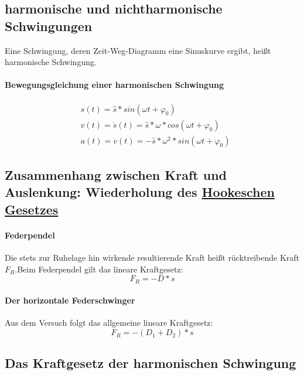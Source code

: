 	\subsection{harmonische und nichtharmonische Schwingungen}
	Eine Schwingung, deren Zeit-Weg-Diagramm eine Sinuskurve ergibt, heißt harmonische Schwingung.
	\paragraph{Bewegungsgleichung einer harmonischen Schwingung}
	\begin{align*}
	&s(t)=\hat{s}*sin(\omega t+\varphi_{0})\\
	&v(t)=\dot{s}(t)=\hat{s}*\omega*cos(\omega t+\varphi_{0})\\
	&a(t)=\dot{v}(t)=-\hat{s}*\omega^{2}*sin(\omega t+\varphi_{0})
	\end{align*}

	\subsection{Zusammenhang zwischen Kraft und Auslenkung: Wiederholung des \underline{Hookeschen Gesetzes}}
	\paragraph{Federpendel}
	Die stets zur Ruhelage hin wirkende resultierende Kraft heißt rücktreibende Kraft$F_R$.\newline Beim Federpendel gilt das lineare Kraftgesetz:
	\begin{equation*}
		F_{R}=-D*s
	\end{equation*}
	\paragraph{Der horizontale Federschwinger}
	Aus dem Versuch folgt das allgemeine lineare Kraftgesetz:
	\begin{equation*}
		F_{R}=-(D_1+D_2)*s
	\end{equation*}
	
	\subsection{Das Kraftgesetz der harmonischen Schwingung}
